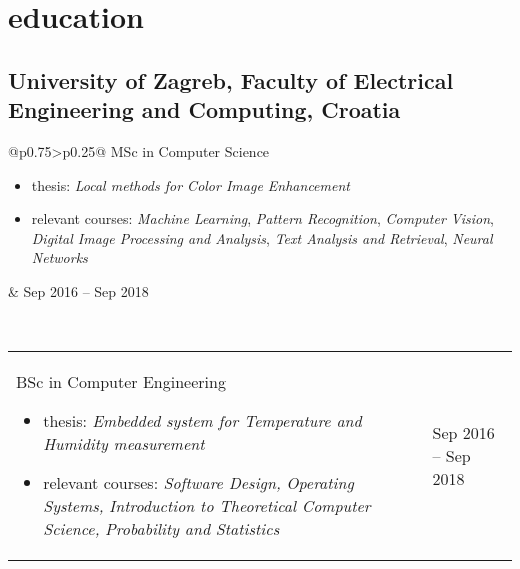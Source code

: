 \documentclass[a4paper]{article}
\makeatletter
\newlength{\tablewidth}
\newenvironment{period}[2]{%
\newcommand{\sarma}{#2}%
\setlength{\tablewidth}{\linewidth}
\addtolength{\tablewidth}{-2\tabcolsep}
\begin{tabular}{@{}p{0.75\tablewidth}>{\raggedleft\arraybackslash}p{0.25\tablewidth}@{}}%
#1 \newline
\begin{itemize}
}{%
\end{itemize} & \sarma \\%
\end{tabular}\\
}
\makeatother
\begin{document}
\section{education}
\subsection{University of Zagreb, Faculty of Electrical Engineering and Computing, Croatia}
\begin{period}{MSc in Computer Science}{Sep 2016 -- Sep 2018}
    \item thesis:
        \textit{Local methods for Color Image Enhancement}
    \item relevant courses:
        \textit{Machine Learning},
        \textit{Pattern Recognition},
        \textit{Computer Vision},
        \textit{Digital Image Processing and Analysis},
        \textit{Text Analysis and Retrieval},
        \textit{Neural Networks}
\end{period}
\begin{period}{BSc in Computer Engineering}{Sep 2012 -- Jul 2016}
    \item thesis:
        \textit{Embedded system for Temperature and Humidity measurement}
    \item relevant courses:
    \textit{Software Design,}
    \textit{Operating Systems,}
    \textit{Introduction to Theoretical Computer Science,}
    \textit{Probability and Statistics}
\end{period}
\end{document}
